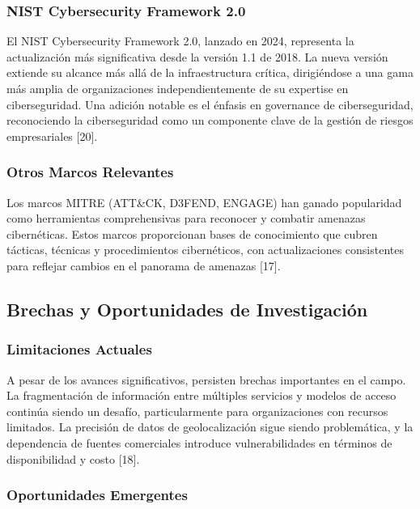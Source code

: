 \subsubsection{NIST Cybersecurity Framework 2.0}

El NIST Cybersecurity Framework 2.0, lanzado en 2024, representa la actualización más significativa desde la versión 1.1 de 2018. La nueva versión extiende su alcance más allá de la infraestructura crítica, dirigiéndose a una gama más amplia de organizaciones independientemente de su expertise en ciberseguridad. Una adición notable es el énfasis en governance de ciberseguridad, reconociendo la ciberseguridad como un componente clave de la gestión de riesgos empresariales [20].

\subsubsection{Otros Marcos Relevantes}

Los marcos MITRE (ATT\&CK, D3FEND, ENGAGE) han ganado popularidad como herramientas comprehensivas para reconocer y combatir amenazas cibernéticas. Estos marcos proporcionan bases de conocimiento que cubren tácticas, técnicas y procedimientos cibernéticos, con actualizaciones consistentes para reflejar cambios en el panorama de amenazas [17].

\subsection{Brechas y Oportunidades de Investigación}

\subsubsection{Limitaciones Actuales}

A pesar de los avances significativos, persisten brechas importantes en el campo. La fragmentación de información entre múltiples servicios y modelos de acceso continúa siendo un desafío, particularmente para organizaciones con recursos limitados. La precisión de datos de geolocalización sigue siendo problemática, y la dependencia de fuentes comerciales introduce vulnerabilidades en términos de disponibilidad y costo [18].

\subsubsection{Oportunidades Emergentes}


